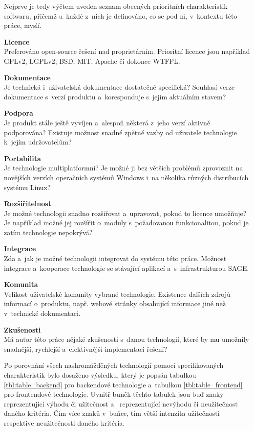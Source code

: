 \documentclass[thesis=M,czech]{FITthesis}[2012/06/26]
\begin{document}
	Nejprve je tedy výčtem uveden seznam obecných prioritních charakteristik softwaru, přičemž u~každé z~nich je definováno, co se pod ní, v~kontextu této práce, myslí.

\begin{description}
\item \textbf{Licence\\}
Preferováno open-source řešení nad proprietárním. Prioritní licence jsou například GPLv2, LGPLv2, BSD, MIT, Apache či dokonce WTFPL.
\item \textbf{Dokumentace\\}
Je technická i~uživatelská dokumentace dostatečně specifická? Souhlasí verze dokumentace s~verzí produktu a~koresponduje s~jejím aktuálním stavem?
\item \textbf{Podpora\\}
Je produkt stále ještě vyvíjen a~alespoň některá z~jeho verzí aktivně podporována? Existuje možnost snadné zpětné vazby od uživatele technologie k~jejím udržovatelům?
\item \textbf{Portabilita\\}
Je technologie multiplatformní? Je možné ji bez větších problémů zprovoznit na novějších verzích operačních systémů Windows i~na několika různých distribucích systému Linux?
\item \textbf{Rozšiřitelnost\\}
Je možné technologii snadno rozšiřovat a~upravovat, pokud to licence umožňuje? Je například možné jej rozšířit o~moduly s~požadovanou funkcionalitou, pokud je zatím technologie nepokrývá?
\item \textbf{Integrace\\}
Zda a~jak je možné technologii integrovat do systému této práce. Možnost integrace a~kooperace technologie se stávající aplikací a~s~infrastrukturou SAGE.
\item \textbf{Komunita\\}
Velikost uživatelské komunity vybrané technologie. Existence dalších zdrojů informací o~produktu, např. webové stránky obsahující informace jiné než v~technické dokumentaci.
\item \textbf{Zkušenosti\\}
Má autor této práce nějaké zkušenosti s~danou technologií, které by mu umožnily snadnější, rychlejší a~efektivnější implementaci řešení?
\end{description}

Po porovnání všech nashromážděných technologií pomocí specifikovaných charakteristik bylo dosaženo výsledku, který je popsán tabulkou \ref{tbl:table_backend} pro backendové technologie a~tabulkou \ref{tbl:table_frontend} pro frontendové technologie. Uvnitř buněk těchto tabulek jsou buď znaky \mbox{\uv{+}} reprezentující výhodu či užitečnost a~\mbox{\uv{--}} reprezentující nevýhodu či neužitečnost daného kritéria. Čím více znaků v~buňce, tím větší intenzita užitečnosti respektive neužitečnosti daného kritéria.
\end{document}
